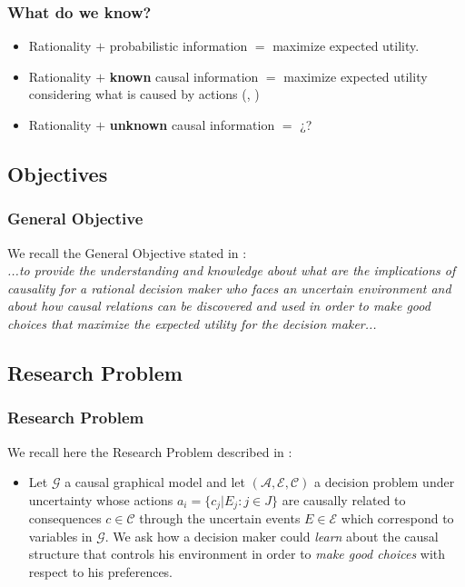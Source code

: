 \documentclass{beamer}
\theoremstyle{plain}
\begin{document}
\begin{frame}
\frametitle{What do we know?}
\begin{itemize}
\item Rationality $+$ probabilistic information $=$ maximize expected utility.
\item Rationality $+$ \textbf{known} causal information $=$ maximize expected utility considering what is caused by actions (\cite{pearl2009causality}, \cite{lattimoreNIPS2016})
\item Rationality $+$ \textbf{unknown} causal information $=$ ¿? 
\end{itemize}
\end{frame}

\subsection{Objectives}
\begin{frame}
\frametitle{General Objective}
We recall the General Objective stated in \cite{gonzalez2019causal}:
\\
\textit{...to provide the understanding and knowledge about what are the implications of causality for a rational decision maker who faces an uncertain environment and about how causal relations can be discovered and used in order to make good choices that maximize the expected utility for the decision maker...}
\end{frame}

\subsection{Research Problem}
\begin{frame}
\frametitle{Research Problem}
We recall here the Research Problem described in \cite{gonzalez2019causal}:
\begin{itemize}
\item Let  $\mathcal{G}$ a causal graphical model and let $(\mathcal{A},\mathcal{E},\mathcal{C})$ a decision problem under uncertainty whose actions $a_i = \{ c_j | E_j : j \in J \}$  are causally related to consequences $c \in \mathcal{C}$ through the uncertain events $E \in \mathcal{E}$ which correspond to variables in $\mathcal{G}$. We ask how a decision maker could \textit{learn} about the causal structure that controls his environment in order to \textit{make good choices} with respect to his preferences.
\end{itemize}
\end{frame}
\end{document}
